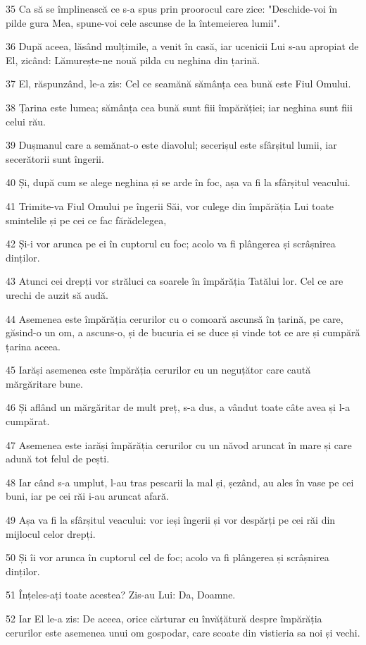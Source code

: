 \par 35 Ca să se împlinească ce s-a spus prin proorocul care zice: "Deschide-voi în pilde gura Mea, spune-voi cele ascunse de la întemeierea lumii".
\par 36 După aceea, lăsând mulțimile, a venit în casă, iar ucenicii Lui s-au apropiat de El, zicând: Lămurește-ne nouă pilda cu neghina din țarină.
\par 37 El, răspunzând, le-a zis: Cel ce seamănă sămânța cea bună este Fiul Omului.
\par 38 Țarina este lumea; sămânța cea bună sunt fiii împărăției; iar neghina sunt fiii celui rău.
\par 39 Dușmanul care a semănat-o este diavolul; secerișul este sfârșitul lumii, iar secerătorii sunt îngerii.
\par 40 Și, după cum se alege neghina și se arde în foc, așa va fi la sfârșitul veacului.
\par 41 Trimite-va Fiul Omului pe îngerii Săi, vor culege din împărăția Lui toate smintelile și pe cei ce fac fărădelegea,
\par 42 Și-i vor arunca pe ei în cuptorul cu foc; acolo va fi plângerea și scrâșnirea dinților.
\par 43 Atunci cei drepți vor străluci ca soarele în împărăția Tatălui lor. Cel ce are urechi de auzit să audă.
\par 44 Asemenea este împărăția cerurilor cu o comoară ascunsă în țarină, pe care, găsind-o un om, a ascuns-o, și de bucuria ei se duce și vinde tot ce are și cumpără țarina aceea.
\par 45 Iarăși asemenea este împărăția cerurilor cu un neguțător care caută mărgăritare bune.
\par 46 Și aflând un mărgăritar de mult preț, s-a dus, a vândut toate câte avea și l-a cumpărat.
\par 47 Asemenea este iarăși împărăția cerurilor cu un năvod aruncat în mare și care adună tot felul de pești.
\par 48 Iar când s-a umplut, l-au tras pescarii la mal și, șezând, au ales în vase pe cei buni, iar pe cei răi i-au aruncat afară.
\par 49 Așa va fi la sfârșitul veacului: vor ieși îngerii și vor despărți pe cei răi din mijlocul celor drepți.
\par 50 Și îi vor arunca în cuptorul cel de foc; acolo va fi plângerea și scrâșnirea dinților.
\par 51 Înțeles-ați toate acestea? Zis-au Lui: Da, Doamne.
\par 52 Iar El le-a zis: De aceea, orice cărturar cu învățătură despre împărăția cerurilor este asemenea unui om gospodar, care scoate din vistieria sa noi și vechi.
